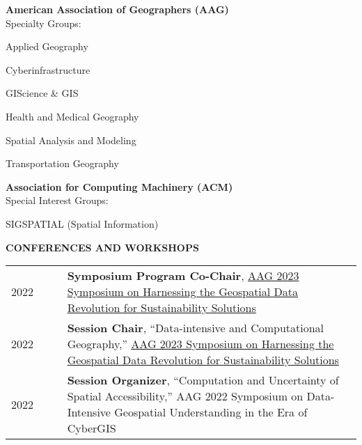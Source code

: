 \documentclass{acmcv}
\begin{document}

    \textbf{American Association of Geographers (AAG)} \\
    Specialty Groups: \\ \vspace{-.3cm}
    \begin{multicols}{2}
    \begin{titemize}
        \item Applied Geography
        \item Cyberinfrastructure
        \item GIScience \& GIS
        \item Health and Medical Geography
        \item Spatial Analysis and Modeling
        \item Transportation Geography
    \end{titemize}
    \end{multicols}

    \textbf{Association for Computing Machinery (ACM)} \\
    Special Interest Groups: \\ 
    \begin{titemize}
        \item SIGSPATIAL (Spatial Information)
    \end{titemize}



    \textbf{\uppercase{Conferences and Workshops}}
    \begin{longtable}{p{0.16\linewidth} p{0.84\linewidth}}
        2022 & \textbf{Symposium Program Co-Chair}, \href{https://iguide.illinois.edu/aag-2023-symposium-on-harnessing-the-geospatial-data-revolution-for-sustainability-solutions/}{AAG 2023 Symposium on Harnessing the Geospatial Data Revolution for Sustainability Solutions}\\

        2022 & \textbf{Session Chair}, ``Data-intensive and Computational Geography,'' \href{https://iguide.illinois.edu/aag-2023-symposium-on-harnessing-the-geospatial-data-revolution-for-sustainability-solutions/}{AAG 2023 Symposium on Harnessing the Geospatial Data Revolution for Sustainability Solutions}\\

        2022 & \textbf{Session Organizer}, ``Computation and Uncertainty of Spatial Accessibility,'' AAG 2022 Symposium on Data-Intensive Geospatial Understanding in the Era of CyberGIS\\
    \end{longtable}
\end{document}
